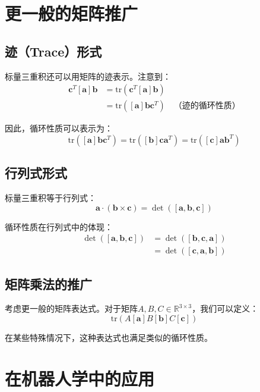 \documentclass[12pt,a4paper]{article}
\begin{document}
\section{更一般的矩阵推广}

\subsection{迹（Trace）形式}

标量三重积还可以用矩阵的迹表示。注意到：
\begin{align}
\bm{c}^T [\bm{a}] \bm{b} &= \text{tr}(\bm{c}^T [\bm{a}] \bm{b}) \\
&= \text{tr}([\bm{a}] \bm{b} \bm{c}^T) \quad \text{（迹的循环性质）}
\end{align}

因此，循环性质可以表示为：
\begin{equation}
\text{tr}([\bm{a}] \bm{b} \bm{c}^T) = \text{tr}([\bm{b}] \bm{c} \bm{a}^T) = \text{tr}([\bm{c}] \bm{a} \bm{b}^T)
\label{eq:trace_form}
\end{equation}

\subsection{行列式形式}

标量三重积等于行列式：
\begin{equation}
\bm{a} \cdot (\bm{b} \times \bm{c}) = \det([\bm{a}, \bm{b}, \bm{c}])
\end{equation}

循环性质在行列式中的体现：
\begin{align}
\det([\bm{a}, \bm{b}, \bm{c}]) &= \det([\bm{b}, \bm{c}, \bm{a}]) \\
&= \det([\bm{c}, \bm{a}, \bm{b}])
\end{align}

\subsection{矩阵乘法的推广}

考虑更一般的矩阵表达式。对于矩阵$A, B, C \in \mathbb{R}^{3 \times 3}$，我们可以定义：
\begin{equation}
\text{tr}(A [\bm{a}] B [\bm{b}] C [\bm{c}])
\end{equation}

在某些特殊情况下，这种表达式也满足类似的循环性质。

\section{在机器人学中的应用}
\end{document}
